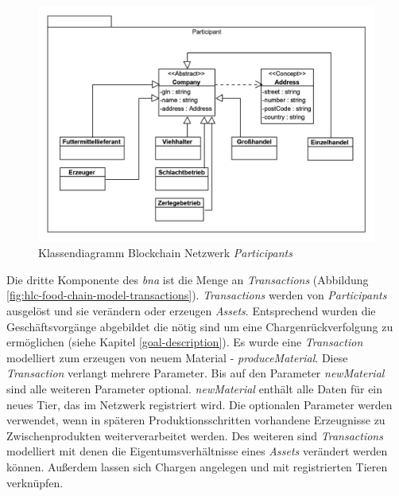 \begin{figure}[H]
	\centering
	\includegraphics[width=1\linewidth]{pictures/hlc-food-chain-model-participants}
	\caption[Klassendiagramm Blockchain Netzwerk \textit{Participants}]{Klassendiagramm Blockchain Netzwerk \textit{Participants}}
	\label{fig:hlc-food-chain-model-participants}
\end{figure}

\noindent
Die dritte Komponente des \textit{\ac{bna}} ist die Menge an \textit{Transactions} (Abbildung \ref{fig:hlc-food-chain-model-transactions}). \textit{Transactions} werden von \textit{Participants} ausgelöst und sie verändern oder erzeugen \textit{Assets}. Entsprechend wurden die Geschäftsvorgänge abgebildet die nötig sind um eine Chargenrückverfolgung zu ermöglichen (siehe Kapitel \ref{goal-description}). Es wurde eine \textit{Transaction} modelliert zum erzeugen von neuem Material - \textit{produceMaterial}. Diese \textit{Transaction} verlangt mehrere Parameter. Bis auf den Parameter \textit{newMaterial} sind alle weiteren Parameter optional. \textit{newMaterial} enthält alle Daten für ein neues Tier, das im Netzwerk registriert wird. Die optionalen Parameter werden verwendet, wenn in späteren Produktionsschritten vorhandene Erzeugnisse zu Zwischenprodukten weiterverarbeitet werden. Des weiteren sind \textit{Transactions} modelliert mit denen die Eigentumsverhältnisse eines \textit{Assets} verändert werden können. Außerdem lassen sich Chargen angelegen und mit registrierten Tieren verknüpfen. 

